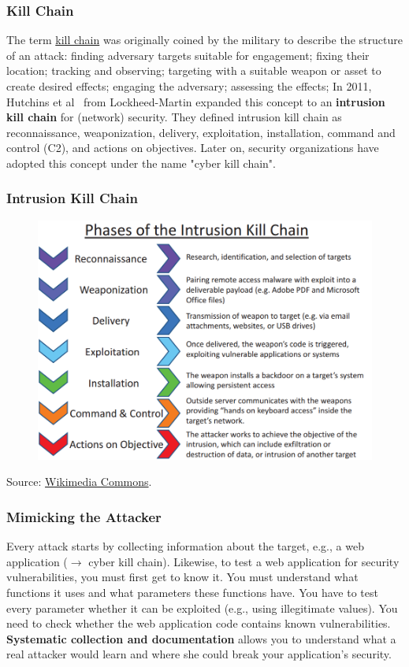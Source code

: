 \documentclass[aspectratio=169]{beamer}
\begin{document}
\begin{frame}
    \frametitle{Kill Chain}
    The term \href{https://en.wikipedia.org/wiki/Kill_chain}{kill chain} was originally coined by the military to describe the structure of an attack: finding adversary targets suitable for engagement; fixing their location; tracking and observing; targeting with a suitable weapon or asset to create desired effects; engaging the adversary; assessing the effects;
    \vfill
    In 2011, Hutchins et al~\cite{hutchins2011intelligence} from Lockheed-Martin expanded this concept to an \textbf{intrusion kill chain} for (network) security. They defined intrusion kill chain as reconnaissance, weaponization, delivery, exploitation, installation, command and control (C2), and actions on objectives. 
    \vfill
    Later on, security organizations have adopted this concept under the name "cyber kill chain".
\end{frame}

\begin{frame}
    \frametitle{Intrusion Kill Chain}
    \begin{figure}
        \includegraphics[scale=.35]{img/intrusion-kill-chain.png}
    \end{figure}
    \vfill
    \small{Source: \href{https://commons.wikimedia.org/wiki/File:Intrusion_Kill_Chain_-_v2.png}{Wikimedia Commons}.}
\end{frame}

\begin{frame}
    \frametitle{Mimicking the Attacker}
    Every attack starts by collecting information about the target, e.g., a web application ($\rightarrow$ cyber kill chain).
    \vfill
    Likewise, to test a web application for security vulnerabilities, you must first get to know it. You must understand what functions it uses and what parameters these functions have. You have to test every parameter whether it can be exploited (e.g., using illegitimate values). You need to check whether the web application code contains known vulnerabilities.
    \vfill
    \textbf{Systematic collection and documentation} allows you to understand what a real attacker would learn and where she could break your application's security.
\end{frame}
\end{document}
